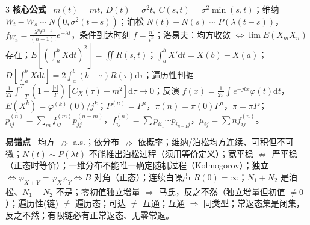 \documentclass[UTF8,a4paper]{ctexart}
\newcommand{\T}[1]{{\bfseries #1}\ }
\newcommand{\Hi}[1]{\textcolor{red!70!black}{#1}}
\newcommand{\dd}{\mathrm{d}}
\begin{document}
\begin{multicols}{3}
\T{核心公式} $m(t)=mt,\ D(t)=\sigma^2t,\ C(s,t)=\sigma^2\min(s,t)$；维纳 $W_t-W_s\sim N(0,\sigma^2(t-s))$；泊松 $N(t)-N(s)\sim P(\lambda(t-s))$，$f_{W_n}=\frac{\lambda^nt^{n-1}}{(n-1)!}e^{-\lambda t}$，条件到达时刻 $f=\frac{n!}{t^n}$；洛易夫：均方收敛 $\iff\lim E(X_mX_n)$ 存在；$E[(\int_a^bX\dd t)^2]=\iint R(s,t)$；$\int_a^bX'\dd t=X(b)-X(a)$；$D[\int_a^bX\dd t]=2\int_a^b(b-\tau)R(\tau)\dd\tau$；遍历性判据 $\frac1{2T}\int_{-T}^T(1-\frac{|\tau|}{T})[C_X(\tau)-m^2]\dd\tau\to0$；反演 $f(x)=\frac1{2\pi}\int e^{-jtx}\varphi(t)\dd t$，$E(X^k)=\varphi^{(k)}(0)/j^k$；$P^{(n)}=P^n$，$\pi(n)=\pi(0)P^n$，$\pi=\pi P$；$p_{ij}^{(n)}=\sum_mf_{ij}^{(m)}p_{jj}^{(n-m)}$，$f_{ij}^{(n)}=\sum p_{ii_1}\cdots p_{i_{n-1}j}$，$\mu_{ij}=\sum nf_{ij}^{(n)}$。

\T{易错点} 均方 $\nRightarrow$ a.s.；依分布 $\nRightarrow$ 依概率；维纳/泊松均方连续、可积但\Hi{不可微}；$N(t)\sim P(\lambda t)$ 不能推出泊松过程（须用等价定义）；宽平稳 $\nRightarrow$ 严平稳（正态时等价）；一维分布不能唯一确定随机过程（Kolmogorov）；独立 $\iff\varphi_{X+Y}=\varphi_X\varphi_Y\iff B$ 对角（正态）；连续白噪声 $R(0)=\infty$；$N_1+N_2$ 是泊松、$N_1-N_2$ 不是；\Hi{零初值独立增量 $\Rightarrow$ 马氏，反之不然（独立增量但初值 $\ne0$）}；\Hi{遍历性(链) $\ne$ 遍历态}；\Hi{可达 $\ne$ 互通；互通 $\Rightarrow$ 同类型}；\Hi{常返态集是闭集，反之不然}；有限链必有正常返态、无零常返。

\end{multicols}
\end{document}
